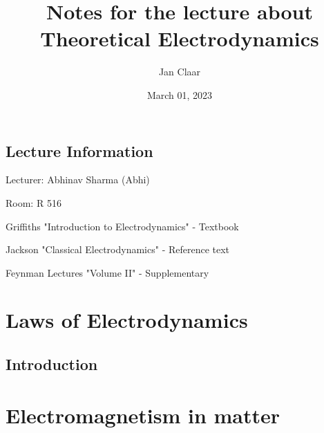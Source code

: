 \documentclass[
    headings=optiontohead,              %
    12pt,                               %
    DIV=13,                             %
    twoside=false,                      %
    open=right,                         %
    BCOR=00mm,                          %
    toc=bibliographynumbered,            %
    parskip=half,                       %
    ]{scrreprt}
\title{Notes for the lecture about Theoretical Electrodynamics}
\author{Jan Claar}
\date{March 01, 2023}
\begin{document}
    \tableofcontents
    \newpage

    \section{Lecture Information} %
    \label{sec:Lecture Information}

    Lecturer: Abhinav Sharma (Abhi)
    
    Room: R 516

    Griffiths "Introduction to Electrodynamics" - Textbook

    Jackson "Classical Electrodynamics" - Reference text

    Feynman Lectures "Volume II" - Supplementary

            
    \chapter{Laws of Electrodynamics} %
    \label{cha:Laws of Electrodynamics}
    

    \section{Introduction} %
    \label{sec:Introduction}



    \chapter{Electromagnetism in matter} %
    \label{cha:Electromagnetism in matter}
    
\end{document}
